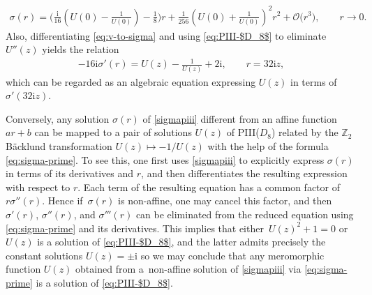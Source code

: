 \documentclass[pdftex]{sigma}
\numberwithin{equation}{section}
\newcommand{\ii}{\mathrm{i}}
\begin{document}
 \begin{gather}
 \sigma(r)=\bigg(\frac{\ii}{16}\left(U(0)-\frac{1}{U(0)}\right)-\frac{1}{8}\bigg)r + \frac{1}{256}\left(U(0)+\frac{1}{U(0)}\right)^2r^2 + \mathcal{O}\big(r^3\big),\qquad \! r\to 0.\!\!\!
 \label{eq:sigma-prime-at-zero}
 \end{gather}
 Also, differentiating \eqref{eq:v-to-sigma} and using \eqref{eq:PIII-$D_8$} to eliminate $U''(z)$ yields the relation
\begin{gather}
 -16\ii \sigma'(r)=U(z)-\frac1{U(z)}+2\ii,\qquad r=32\ii z,\label{eq:sigma-prime}
\end{gather}
 which can be regarded as an algebraic equation expressing $U(z)$ in terms of $\sigma'(32\ii z)$.


 Conversely, any solution $\sigma(r)$ of \eqref{sigmapiii} different from an affine function $a r+b$ can be mapped to a pair of solutions $U(z)$ of PIII($D_8$) related by the $\mathbb Z_2$ B\"acklund transformation ${U(z)\mapsto -1/U(z)}$ with the help of the formula \eqref{eq:sigma-prime}. To see this, one first uses \eqref{sigmapiii} to explicitly express $\sigma(r)$ in terms of its derivatives and $r$, and then differentiates the resulting expression with respect to $r$. Each term of the resulting equation has a common factor of $r\sigma''(r)$. Hence if~$\sigma(r)$ is non-affine, one may cancel this factor, and then $\sigma'(r)$, $\sigma''(r)$, and $\sigma'''(r)$ can be eliminated from the reduced equation using \eqref{eq:sigma-prime} and its derivatives. This implies that either~$U(z)^2+1=0$ or $U(z)$ is a solution of \eqref{eq:PIII-$D_8$}, and the latter admits precisely the constant solutions $U(z)=\pm\ii$ so we may conclude that any meromorphic function $U(z)$ obtained from a~non-affine solution of \eqref{sigmapiii} via \eqref{eq:sigma-prime} is a solution of \eqref{eq:PIII-$D_8$}.
\end{document}
